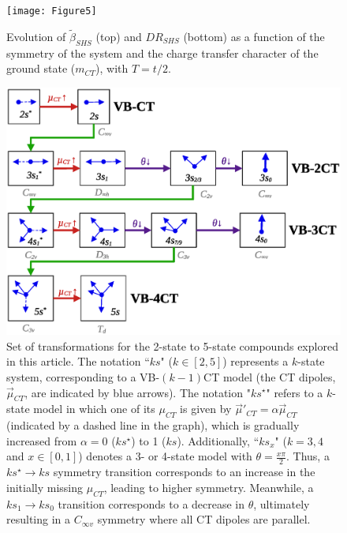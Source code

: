 \documentclass[USenglish]{article}
\begin{document}
\begin{figure}[!h]
	\texttt{[image: Figure5]}
	\caption{Evolution of $\tilde \beta_{SHS}$ (top) and $DR_{SHS}$ (bottom) as a function of the symmetry of the system and the charge transfer character of the ground state ($m_{CT}$), with $T=t/2$.}
	\label{fig:beta}
\end{figure}

\begin{figure}
	\includegraphics[width=.8\linewidth]{Figure6}
	\caption{Set of transformations for the 2-state to 5-state compounds explored in this article. The notation ``$ks$" ($k \in [2,5]$) represents a $k$-state system, corresponding to a VB-$(k-1)$CT model (the CT dipoles, $\vec\mu_{CT}$, are indicated by blue arrows). The notation "$ks^\star$" refers to a $k$-state model in which one of its $\mu_{CT}$ is given by $\vec\mu'_{CT} = \alpha\vec\mu_{CT}$ (indicated by a dashed line in the graph), which is gradually increased from $\alpha=0$ ($ks^\star$) to 1 ($ks$).  Additionally, ``$ks_x$" ($k=3,4$ and $x \in [0,1]$) denotes a 3- or 4-state model with $\theta = \frac{x\pi}{2}$. Thus, a $ks^\star \to ks$ symmetry transition corresponds to an increase in the initially missing $\mu_{CT}$, leading to higher symmetry. Meanwhile, a $ks_1 \to ks_0$ transition corresponds to a decrease in $\theta$, ultimately resulting in a $C_{\infty v}$ symmetry where all CT dipoles are parallel.}
	\label{sc:symmetry}
\end{figure}
\end{document}
